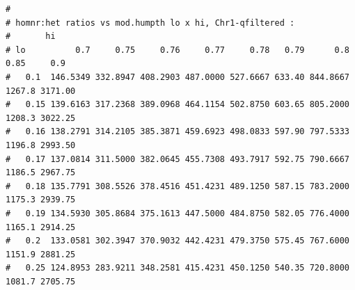 \documentclass{article}\usepackage[]{graphicx}\usepackage[]{color}
\makeatletter
\newenvironment{kframe}{%
 \def\at@end@of@kframe{}%
 \ifinner\ifhmode%
  \def\at@end@of@kframe{\end{minipage}}%
  \begin{minipage}{\columnwidth}%
 \fi\fi%
 \def\FrameCommand##1{\hskip\@totalleftmargin \hskip-\fboxsep
 \colorbox{shadecolor}{##1}\hskip-\fboxsep
     \hskip-\linewidth \hskip-\@totalleftmargin \hskip\columnwidth}%
 \MakeFramed {\advance\hsize-\width
   \@totalleftmargin\z@ \linewidth\hsize
   \@setminipage}}%
 {\par\unskip\endMakeFramed%
 \at@end@of@kframe}
\newenvironment{knitrout}{}{} %
\makeatother
\begin{document}
\begin{knitrout}
\begin{kframe}\begin{verbatim}
# 
# homnr:het ratios vs mod.humpth lo x hi, Chr1-qfiltered :
#       hi
# lo          0.7     0.75     0.76     0.77     0.78   0.79      0.8   0.85     0.9
#   0.1  146.5349 332.8947 408.2903 487.0000 527.6667 633.40 844.8667 1267.8 3171.00
#   0.15 139.6163 317.2368 389.0968 464.1154 502.8750 603.65 805.2000 1208.3 3022.25
#   0.16 138.2791 314.2105 385.3871 459.6923 498.0833 597.90 797.5333 1196.8 2993.50
#   0.17 137.0814 311.5000 382.0645 455.7308 493.7917 592.75 790.6667 1186.5 2967.75
#   0.18 135.7791 308.5526 378.4516 451.4231 489.1250 587.15 783.2000 1175.3 2939.75
#   0.19 134.5930 305.8684 375.1613 447.5000 484.8750 582.05 776.4000 1165.1 2914.25
#   0.2  133.0581 302.3947 370.9032 442.4231 479.3750 575.45 767.6000 1151.9 2881.25
#   0.25 124.8953 283.9211 348.2581 415.4231 450.1250 540.35 720.8000 1081.7 2705.75
\end{verbatim}
\end{kframe}
\end{knitrout}
\end{document}
